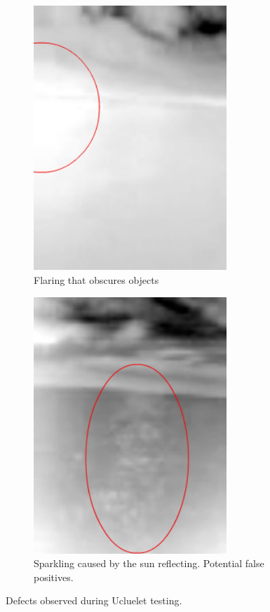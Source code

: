 \begin{figure}[h]
\begin{subfigure}{0.3\textwidth}
 \includegraphics[width=0.8\textwidth]{"./image/flaring_circled"}
 \caption{Flaring that obscures objects}
 \label{fig:defects:sub2}
\end{subfigure}
\begin{subfigure}{0.3\textwidth}
 \centering
 \includegraphics[width=0.8\textwidth]{"./image/sparkles_circled"}
 \caption{Sparkling caused by the sun reflecting. Potential false positives.}
 \label{fig:defects:sub3}
\end{subfigure}
\caption{Defects observed during Ucluelet testing.}
\label{fig:defects}
\end{figure}

